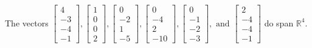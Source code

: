 \begin{exercise}
\begin{exerciseStatement}
  \end{exerciseStatement}
  \begin{exerciseAnswer}
   The vectors \(\left[\begin{array}{r}
4 \\
-3 \\
-4 \\
-1
\end{array}\right] , \left[\begin{array}{r}
1 \\
0 \\
0 \\
2
\end{array}\right] , \left[\begin{array}{r}
0 \\
-2 \\
1 \\
-5
\end{array}\right] , \left[\begin{array}{r}
0 \\
-4 \\
2 \\
-10
\end{array}\right] , \left[\begin{array}{r}
0 \\
-1 \\
-2 \\
-3
\end{array}\right] , \text{ and } \left[\begin{array}{r}
2 \\
-4 \\
-4 \\
-1
\end{array}\right]\) 
  	 do  
	span \(\mathbb{R}^4\).
  


  \end{exerciseAnswer}
\end{exercise}